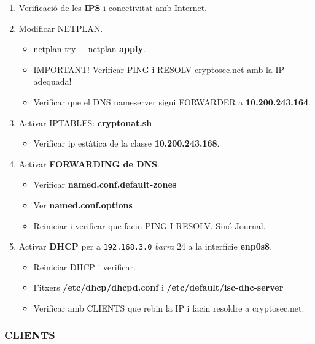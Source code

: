 \documentclass[]{article}
\providecommand{\tightlist}{%
  \setlength{\itemsep}{0pt}\setlength{\parskip}{0pt}}
\begin{document}
\begin{enumerate}
\def\labelenumi{\arabic{enumi}.}
\item
  Verificació de les \textbf{IPS} i conectivitat amb Internet.
\item
  Modificar NETPLAN.

  \begin{itemize}
  \item
    netplan try + netplan \textbf{apply}.
  \item
    IMPORTANT! Verificar PING i RESOLV cryptosec.net amb la IP adequada!
  \item
    Verificar que el DNS nameserver sigui FORWARDER a
    \textbf{10.200.243.164}.
  \end{itemize}
\item
  Activar IPTABLES: \textbf{cryptonat.sh}

  \begin{itemize}
  \tightlist
  \item
    Verificar ip estàtica de la classe \textbf{10.200.243.168}.
  \end{itemize}
\item
  Activar \textbf{FORWARDING de DNS}.

  \begin{itemize}
  \item
    Verificar \textbf{named.conf.default-zones}
  \item
    Ver \textbf{named.conf.options}
  \item
    Reiniciar i verificar que facin PING I RESOLV. Sinó Journal.
  \end{itemize}
\item
  Activar \textbf{DHCP} per a \texttt{192.168.3.0} \emph{barra} 24 a la
  interfície \textbf{enp0s8}.

  \begin{itemize}
  \item
    Reiniciar DHCP i verificar.
  \item
    Fitxers \textbf{/etc/dhcp/dhcpd.conf} i
    \textbf{/etc/default/isc-dhc-server}
  \item
    Verificar amb CLIENTS que rebin la IP i facin resoldre a
    cryptosec.net.
  \end{itemize}
\end{enumerate}

\hypertarget{clients}{%
\subsubsection{\texorpdfstring{\textbf{CLIENTS}}{CLIENTS}}\label{clients}}
\end{document}

